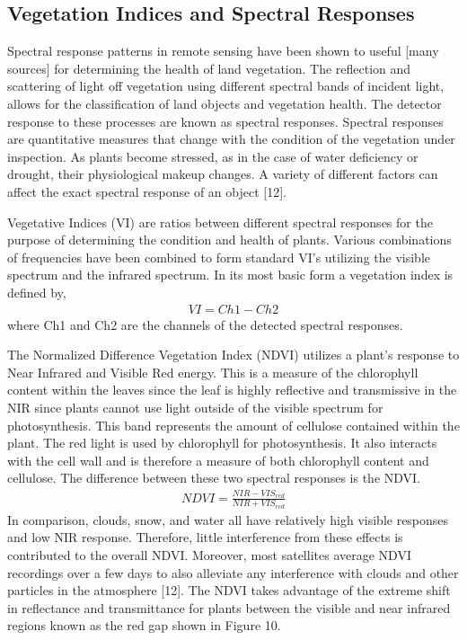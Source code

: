 \subsection{Vegetation Indices and Spectral Responses}
Spectral response patterns in remote sensing have been shown to useful [many sources] for determining the health of land vegetation.  The reflection and scattering of light off vegetation using different spectral bands of incident light, allows for the classification of land objects and vegetation health.  The detector response to these processes are known as spectral responses.  Spectral responses are quantitative measures that change with the condition of the vegetation under inspection.  As plants become stressed, as in the case of water deficiency or drought, their physiological makeup changes.  A variety of different factors can affect the exact spectral response of an object [12].

Vegetative Indices (VI) are ratios between different spectral responses for the purpose of determining the condition and health of plants.  Various combinations of frequencies have been combined to form standard VI’s utilizing the visible spectrum and the infrared spectrum. In its most basic form a vegetation index is defined by,
%
\begin{align}
    VI = Ch1 - Ch2
\end{align}
%
where Ch1 and Ch2 are the channels of the detected spectral responses.

The Normalized Difference Vegetation Index (NDVI) utilizes a plant's response to Near Infrared and Visible Red energy.  This is a measure of the chlorophyll content within the leaves since the leaf is highly reflective and transmissive in the NIR since plants cannot use light outside of the visible spectrum for photosynthesis.  This band represents the amount of cellulose contained within the plant.  The red light is used by chlorophyll for photosynthesis.  It also interacts with the cell wall and is therefore a measure of both chlorophyll content and cellulose.  The difference between these two spectral responses is the NDVI.
%
\begin{align}
    NDVI = \frac{NIR - VIS_{red}}{NIR + VIS_{red}}
\end{align}
%
In comparison, clouds, snow, and water all have relatively high visible responses and low NIR response.  Therefore, little interference from these effects is contributed to the overall NDVI.  Moreover, most satellites average NDVI recordings over a few days to also alleviate any interference with clouds and other particles in the atmosphere [12].
The NDVI takes advantage of the extreme shift in reflectance and transmittance for plants between the visible and near infrared regions known as the red gap shown in Figure 10.

